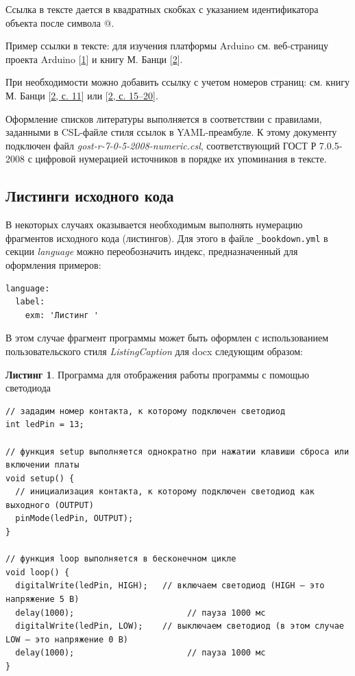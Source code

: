 \documentclass[
  a4paper,
]{book}
\theoremstyle{definition}
\theoremstyle{definition}
\newtheorem{example}{Листинг}[chapter]
\theoremstyle{definition}
\theoremstyle{definition}
\theoremstyle{remark}
\begin{document}
Ссылка в тексте дается в квадратных скобках с указанием идентификатора объекта после символа @.

Пример ссылки в тексте: для изучения платформы Arduino см. веб-страницу проекта Arduino {[}\protect\hyperlink{ref-arduino}{1}{]} и книгу М. Банци {[}\protect\hyperlink{ref-banzi}{2}{]}.

При необходимости можно добавить ссылку с учетом номеров страниц: см. книгу М. Банци {[}\protect\hyperlink{ref-banzi}{2, с. 11}{]} или {[}\protect\hyperlink{ref-banzi}{2, с. 15--20}{]}.

Оформление списков литературы выполняется в соответствии с правилами, заданными в CSL-файле стиля ссылок в YAML-преамбуле. К этому документу подключен файл \emph{gost-r-7-0-5-2008-numeric.csl}, соответствующий ГОСТ Р 7.0.5-2008 с цифровой нумерацией источников в порядке их упоминания в тексте.

\hypertarget{markdown-listings}{%
\subsection{Листинги исходного кода}\label{markdown-listings}}

В некоторых случаях оказывается необходимым выполнять нумерацию фрагментов исходного кода (листингов). Для этого в файле \texttt{\_bookdown.yml} в секции \emph{language} можно переобозначить индекс, предназначенный для оформления примеров:

\begin{verbatim}
language:
  label:
    exm: 'Листинг '
\end{verbatim}

В этом случае фрагмент программы может быть оформлен с использованием пользовательского стиля \emph{ListingCaption} для docx следующим образом:

\begin{example}
\protect\hypertarget{exm:code-blink}{}\label{exm:code-blink}Программа для отображения работы программы с помощью светодиода
\end{example}

\begin{verbatim}
// зададим номер контакта, к которому подключен светодиод
int ledPin = 13;

// функция setup выполняется однократно при нажатии клавиши сброса или включении платы
void setup() {
  // инициализация контакта, к которому подключен светодиод как выходного (OUTPUT)
  pinMode(ledPin, OUTPUT);
}

// функция loop выполняется в бесконечном цикле
void loop() {
  digitalWrite(ledPin, HIGH);   // включаем светодиод (HIGH – это напряжение 5 В)
  delay(1000);                       // пауза 1000 мс
  digitalWrite(ledPin, LOW);    // выключаем светодиод (в этом случае LOW – это напряжение 0 В)
  delay(1000);                       // пауза 1000 мс
}
\end{verbatim}
\end{document}
